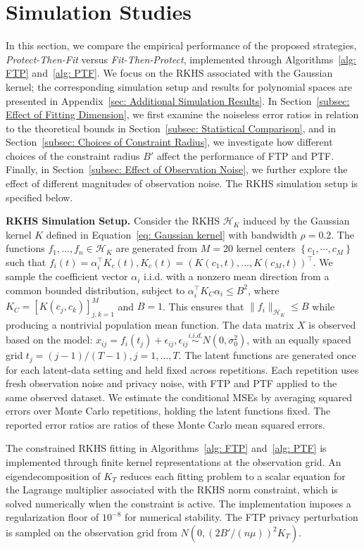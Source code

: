 \documentclass[twoside,11pt]{article}
\newcommand{\Set}[1]{\left\{{#1}\right\}} %
\begin{document}
\section{Simulation Studies}
\label{sec: Simulation Study}
In this section, we compare the empirical performance of the proposed strategies, \emph{Protect-Then-Fit} versus \emph{Fit-Then-Protect}, implemented through
Algorithms~\ref{alg: FTP} and~\ref{alg: PTF}. We focus on the RKHS associated with the Gaussian kernel; the corresponding simulation setup and results for polynomial spaces are presented in Appendix~\ref{sec: Additional Simulation Results}. In Section~\ref{subsec: Effect of Fitting Dimension}, we first examine the noiseless error ratios in relation to the theoretical bounds in Section~\ref{subsec: Statistical Comparison}, and in Section~\ref{subsec: Choices of Constraint Radius}, we investigate how different choices of the constraint radius $B'$ affect the performance of FTP and PTF. Finally, in Section~\ref{subsec: Effect of Observation Noise}, we further explore the effect of different magnitudes of observation noise. The RKHS simulation setup is specified below.

\textbf{RKHS Simulation Setup.} Consider the RKHS $\mathcal{H}_K$ induced by the Gaussian kernel $K$ defined in Equation~\eqref{eq: Gaussian kernel} with bandwidth $\rho=0.2$. The functions $f_1,\ldots,f_n\in\mathcal{H}_K$ are generated from $M=20$ kernel centers $\Set{c_1,\cdots,c_M}$ such that $f_i(t) = \alpha_i^\top K_c(t), K_c(t) = (K(c_1,t),\ldots,K(c_M,t))^\top$. We sample the coefficient vector $\alpha_i$ i.i.d. with a nonzero mean direction from a common bounded distribution, subject to $\alpha_i^\top K_{C}\alpha_i\le B^2$, where $K_{C}=[K(c_j,c_k)]_{j,k=1}^M$ and $B=1$. This ensures that $\|f_i\|_{\mathcal H_K}\le B$ while producing a nontrivial population mean function. The data matrix $X$ is observed based on the model: $x_{ij} = f_i(t_j)+\epsilon_{ij}, \epsilon_{ij}\overset{i.i.d.}{\sim} N(0,\sigma_0^2)$, with an equally spaced grid $t_j=(j-1)/(T-1), j=1,\ldots,T$. The latent functions are generated once for each latent-data setting and held fixed across repetitions. Each repetition uses fresh observation noise and privacy noise, with FTP and PTF applied to the same observed dataset. We estimate the conditional MSEs by averaging squared errors over Monte Carlo repetitions, holding the latent functions fixed. The reported error ratios are ratios of these Monte Carlo mean squared errors.

The constrained RKHS fitting in Algorithms~\ref{alg: FTP} and~\ref{alg: PTF} is implemented through finite kernel representations at the observation grid. An eigendecomposition of $K_T$ reduces each fitting problem to a scalar equation for the Lagrange multiplier associated with the RKHS norm constraint, which is solved numerically when the constraint is active. The implementation imposes a regularization floor of $10^{-8}$ for numerical stability. The FTP privacy perturbation is sampled on the observation grid from $N\!\left(0,(2B'/(n\mu))^2K_T\right)$.
\end{document}
